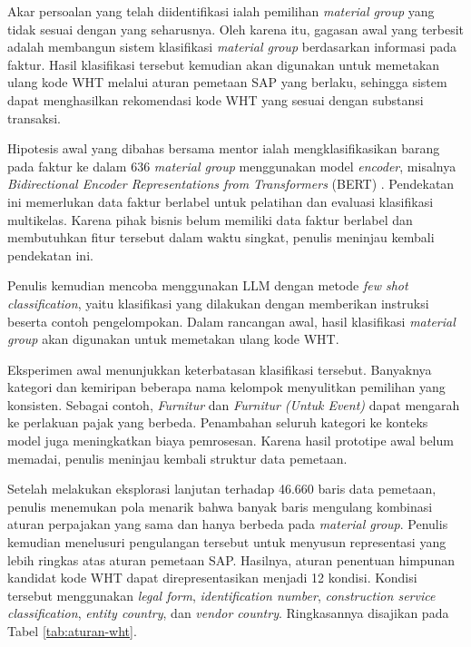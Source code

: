 Akar persoalan yang telah diidentifikasi ialah pemilihan \textit{material group} yang tidak sesuai dengan yang seharusnya. Oleh karena itu, gagasan awal yang terbesit adalah membangun sistem klasifikasi \textit{material group} berdasarkan informasi pada faktur. Hasil klasifikasi tersebut kemudian akan digunakan untuk memetakan ulang kode WHT melalui aturan pemetaan SAP yang berlaku, sehingga sistem dapat menghasilkan rekomendasi kode WHT yang sesuai dengan substansi transaksi.

Hipotesis awal yang dibahas bersama mentor ialah mengklasifikasikan barang pada faktur ke dalam 636 \textit{material group} menggunakan model \textit{encoder}, misalnya \textit{Bidirectional Encoder Representations from Transformers} (\label{abbr:BERT}BERT) \parencite{devlin2019bert}. Pendekatan ini memerlukan data faktur berlabel untuk pelatihan dan evaluasi klasifikasi multikelas. Karena pihak bisnis belum memiliki data faktur berlabel dan membutuhkan fitur tersebut dalam waktu singkat, penulis meninjau kembali pendekatan ini.

Penulis kemudian mencoba menggunakan \label{abbr:LLM}LLM dengan metode \textit{few shot classification}, yaitu klasifikasi yang dilakukan dengan memberikan instruksi beserta contoh pengelompokan. Dalam rancangan awal, hasil klasifikasi \textit{material group} akan digunakan untuk memetakan ulang kode WHT.

Eksperimen awal menunjukkan keterbatasan klasifikasi tersebut. Banyaknya kategori dan kemiripan beberapa nama kelompok menyulitkan pemilihan yang konsisten. Sebagai contoh, \textit{Furnitur} dan \textit{Furnitur (Untuk Event)} dapat mengarah ke perlakuan pajak yang berbeda. Penambahan seluruh kategori ke konteks model juga meningkatkan biaya pemrosesan. Karena hasil prototipe awal belum memadai, penulis meninjau kembali struktur data pemetaan.

Setelah melakukan eksplorasi lanjutan terhadap 46.660 baris data pemetaan, penulis menemukan pola menarik bahwa banyak baris mengulang kombinasi aturan perpajakan yang sama dan hanya berbeda pada \textit{material group}. Penulis kemudian menelusuri pengulangan tersebut untuk menyusun representasi yang lebih ringkas atas aturan pemetaan SAP. Hasilnya, aturan penentuan himpunan kandidat kode WHT dapat direpresentasikan menjadi 12 kondisi. Kondisi tersebut menggunakan \textit{legal form}, \textit{identification number}, \textit{construction service classification}, \textit{entity country}, dan \textit{vendor country}. Ringkasannya disajikan pada Tabel \ref{tab:aturan-wht}.

